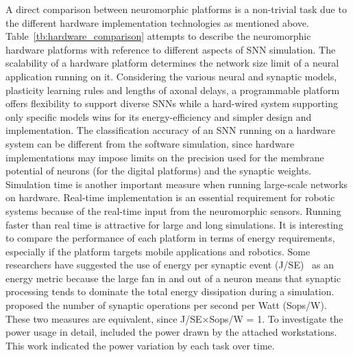 \documentclass{frontiersENG} %
\begin{document}
A direct comparison between neuromorphic platforms is a non-trivial task due to the different hardware implementation technologies as mentioned above.
Table~\ref{tb:hardware_comparison} attempts to describe the neuromorphic hardware platforms with reference to different aspects of SNN simulation.
The scalability of a hardware platform determines the network size limit of a neural application running on it.
Considering the various neural and synaptic models, plasticity learning rules and lengths of axonal delays, a programmable platform offers flexibility to support diverse SNNs while a hard-wired system supporting only specific models wins for its energy-efficiency and simpler design and implementation.
The classification accuracy of an SNN running on a hardware system can be different from the software simulation, since hardware implementations may impose limits on the precision used for the membrane potential of neurons (for the digital platforms) and the synaptic weights.
Simulation time is another important measure when running large-scale networks on hardware.
Real-time implementation is an essential requirement for robotic systems because of the real-time input from the neuromorphic sensors.
Running faster than real time is attractive for large and long simulations.
It is interesting to compare the performance of each platform in terms of energy requirements, especially if the platform targets mobile applications and robotics.
Some researchers have suggested the use of energy per synaptic event (J/SE)~\citep{sharp2012power,stromatias2013power} as an energy metric because the large fan in and out of a neuron means that synaptic processing tends to dominate the total energy dissipation during a simulation.
\cite{merolla2014million} proposed the number of synaptic operations per second per Watt (Sops/W).
These two measures are equivalent, since J/SE$\times$Sops/W = 1.
To investigate the power usage in detail, \cite{Diamond2016comparing} included the power drawn by the attached workstations.
This work indicated the power variation by each task over time.
\end{document}
